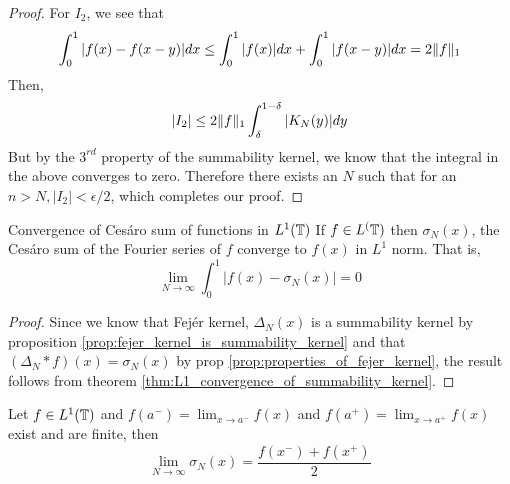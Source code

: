 \begin{proof}
    For $I_2$, we see that 
    \begin{displaymath}
      \int_0^1 |f(x) - f(x-y)|dx \le \int_0^1 |f(x)| dx + \int_0^1 |f(x-y)| dx = 2\lVert f\rVert_1
    \end{displaymath}
  Then,
  \begin{displaymath}
    |I_2| \le 2\lVert f\rVert_1 \int_{\delta}^{1-\delta} |K_N(y)|dy
  \end{displaymath}
But by the $3^{rd}$ property of the summability kernel, we know that the integral in the above converges to zero. Therefore there exists an $N$ such that for an $n>N, |I_2|< \epsilon/2$, which completes our proof.
  \end{proof}

  \begin{corollary}{Convergence of Ces\'aro sum of functions in $L^1(\mathbb T)$}
    If $f\in L^(\mathbb T)$ then $\sigma_N(x)$, the Ces\'aro sum of the Fourier series of $f$ converge to $f(x)$ in $L^1$ norm. That is, 
    \begin{displaymath}
      \lim_{N\to \infty} \int_0^1 \left|f(x) - \sigma_N(x)\right| = 0
    \end{displaymath}
  \end{corollary}
  \begin{proof}
    Since we know that Fej\'er kernel, $\Delta_N(x)$ is a summability kernel by proposition \ref{prop:fejer_kernel_is_summability_kernel} and that $(\Delta_N*f)(x) = \sigma_N(x)$ by prop \ref{prop:properties_of_fejer_kernel}, the result follows from theorem \ref{thm:L1_convergence_of_summability_kernel}.
  \end{proof}

  \begin{theorem}
    \label{fejer_theorem}
    Let $f \in L^1(\mathbb T)$ and $f(a^-) = \lim_{x \to a^-} f(x)$ and $f(a^+) = \lim_{x \to a^+} f(x)$ exist and are finite, then
    $$\lim_{ N\to \infty} \sigma_N(x) = \frac{f(x^-) + f(x^+)}{2}$$
  \end{theorem}

